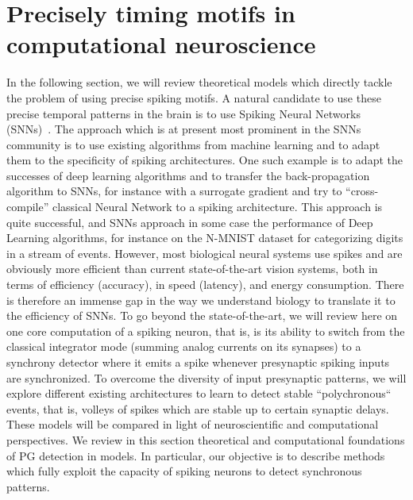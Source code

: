 \documentclass[brainsci, %
               review,submit,pdftex,moreauthors%
               ]{Definitions/mdpi}
\begin{document}
\section{Precisely timing motifs in computational neuroscience}
In the following section, we will review theoretical models which directly tackle the problem of using precise spiking motifs. 
A natural candidate to use these precise temporal patterns in the brain is to use Spiking Neural Networks (SNNs)~\citep{maass_networks_1997}. The approach which is at present most prominent in the SNNs community is to use existing algorithms from machine learning and to adapt them to the specificity of spiking architectures. One such example is to adapt the successes of deep learning algorithms and to transfer the back-propagation algorithm to SNNs, for instance with a surrogate gradient and try to ``cross-compile'' classical Neural Network to a spiking architecture. This approach is quite successful, and SNNs approach in some case the performance of Deep Learning algorithms, for instance on the N-MNIST dataset for categorizing digits in a stream of events. However, most biological neural systems use spikes and are obviously more efficient than current state-of-the-art vision systems, both in terms of efficiency (accuracy), in speed (latency), and energy consumption. There is therefore an immense gap in the way we understand biology to translate it to the efficiency of SNNs.  To go beyond the state-of-the-art, we will review here on one core computation of a spiking neuron, that is, is its ability to switch from the classical integrator mode (summing analog currents on its synapses) to a synchrony detector where it emits a spike whenever presynaptic spiking inputs are synchronized. To overcome the diversity of input presynaptic patterns, we will explore different existing architectures to learn to detect stable ``polychronous`` events, that is, volleys of spikes which are stable up to certain synaptic delays. These models will be compared in light of neuroscientific and computational perspectives. We review in this section theoretical and computational foundations of PG detection in models. In particular, our objective is to describe methods which fully exploit the capacity of spiking neurons to detect synchronous patterns.
\end{document}
